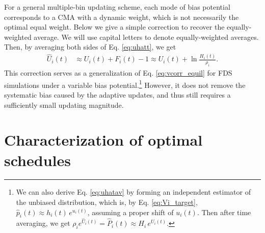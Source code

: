 \documentclass[reprint, superscriptaddress, floatfix]{revtex4-1}
\begin{document}
For a general multiple-bin updating scheme,
each mode of bias potential
corresponds to a CMA with a dynamic weight,
which is not necessarily the optimal equal weight.
%
Below we give a simple correction
to recover the equally-weighted average.
%
We will use capital letters to denote equally-weighted averages.
%
Then, by averaging both sides of Eq. \eqref{eq:uhatt}, we get
\begin{align}
  \hat U_i(t)
  &\approx
  U_i (t)
  + F_i(t) - 1
  \approx
  U_i(t)
  + \ln \frac{ H_i(t) } { \rho_i }
  .
  \label{eq:uhatav}
\end{align}
%
This correction serves as
a generalization of Eq. \eqref{eq:vcorr_equil}
for FDS simulations under
a variable bias potential.\footnote{We can also
  derive Eq. \eqref{eq:uhatav}
  by forming an independent estimator
  of the unbiased distribution\cite{marsili2006},
  which is, by Eq. \eqref{eq:Vi_target},
  $\hat p_i(t) \approx h_i(t) \, e^{ u_i(t) }$,
  assuming a proper shift of $u_i(t)$.
  Then after time averaging, we get
  $\rho_i e^{\hat U_i(t)} = \hat P_i(t) \approx H_i \, e^{ U_i(t) }$.}
%
However, it does not remove the systematic bias
caused by the adaptive updates,
and thus still requires a sufficiently small updating magnitude.







\section{\label{sec:schedule_geometry}
Characterization of optimal schedules}
\end{document}
